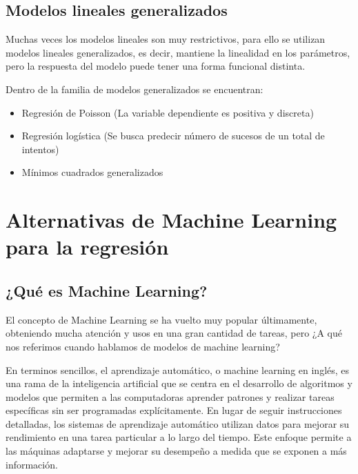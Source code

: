 \documentclass[
]{book}
\providecommand{\tightlist}{%
  \setlength{\itemsep}{0pt}\setlength{\parskip}{0pt}}
\begin{document}
\hypertarget{modelos-lineales-generalizados}{%
\subsection{Modelos lineales generalizados}\label{modelos-lineales-generalizados}}

Muchas veces los modelos lineales son muy restrictivos, para ello se
utilizan modelos lineales generalizados, es decir, mantiene la
linealidad en los parámetros, pero la respuesta del modelo puede tener
una forma funcional distinta.

Dentro de la familia de modelos generalizados se encuentran:

\begin{itemize}
\tightlist
\item
  Regresión de Poisson (La variable dependiente es positiva y
  discreta)
\item
  Regresión logística (Se busca predecir número de sucesos de un total
  de intentos)
\item
  Mínimos cuadrados generalizados
\end{itemize}

\hypertarget{alternativas-de-machine-learning-para-la-regresiuxf3n}{%
\section{Alternativas de Machine Learning para la regresión}\label{alternativas-de-machine-learning-para-la-regresiuxf3n}}

\hypertarget{quuxe9-es-machine-learning}{%
\subsection{¿Qué es Machine Learning?}\label{quuxe9-es-machine-learning}}

El concepto de Machine Learning se ha vuelto muy popular últimamente,
obteniendo mucha atención y usos en una gran cantidad de tareas, pero ¿A
qué nos referimos cuando hablamos de modelos de machine learning?

En terminos sencillos, el aprendizaje automático, o machine learning en
inglés, es una rama de la inteligencia artificial que se centra en el
desarrollo de algoritmos y modelos que permiten a las computadoras
aprender patrones y realizar tareas específicas sin ser programadas
explícitamente. En lugar de seguir instrucciones detalladas, los
sistemas de aprendizaje automático utilizan datos para mejorar su
rendimiento en una tarea particular a lo largo del tiempo. Este enfoque
permite a las máquinas adaptarse y mejorar su desempeño a medida que se
exponen a más información.
\end{document}
